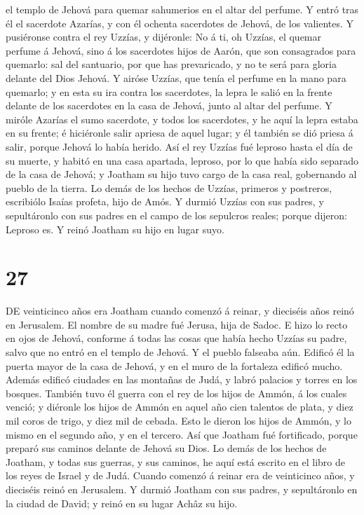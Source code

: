 el templo de Jehová para quemar sahumerios en el altar del perfume.
 Y entró tras él el sacerdote Azarías, y con él ochenta
sacerdotes de Jehová, de los valientes.  Y pusiéronse
contra el rey Uzzías, y dijéronle: No á ti, oh Uzzías, el quemar perfume
á Jehová, sino á los sacerdotes hijos de Aarón, que son consagrados para
quemarlo: sal del santuario, por que has prevaricado, y no te será para
gloria delante del Dios Jehová.  Y airóse Uzzías, que
tenía el perfume en la mano para quemarlo; y en esta su ira contra los
sacerdotes, la lepra le salió en la frente delante de los sacerdotes en
la casa de Jehová, junto al altar del perfume.  Y miróle
Azarías el sumo sacerdote, y todos los sacerdotes, y he aquí la lepra
estaba en su frente; é hiciéronle salir apriesa de aquel lugar; y él
también se dió priesa á salir, porque Jehová lo había herido.
 Así el rey Uzzías fué leproso hasta el día de su muerte,
y habitó en una casa apartada, leproso, por lo que había sido separado
de la casa de Jehová; y Joatham su hijo tuvo cargo de la casa real,
gobernando al pueblo de la tierra.  Lo demás de los
hechos de Uzzías, primeros y postreros, escribiólo Isaías profeta, hijo
de Amós.  Y durmió Uzzías con sus padres, y sepultáronlo
con sus padres en el campo de los sepulcros reales; porque dijeron:
Leproso es. Y reinó Joatham su hijo en lugar suyo.

\hypertarget{section-26}{%
\section{27}\label{section-26}}

 DE veinticinco años era Joatham cuando comenzó á reinar,
y dieciséis años reinó en Jerusalem. El nombre de su madre fué Jerusa,
hija de Sadoc.  E hizo lo recto en ojos de Jehová,
conforme á todas las cosas que había hecho Uzzías su padre, salvo que no
entró en el templo de Jehová. Y el pueblo falseaba aún. 
Edificó él la puerta mayor de la casa de Jehová, y en el muro de la
fortaleza edificó mucho.  Además edificó ciudades en las
montañas de Judá, y labró palacios y torres en los bosques.
 También tuvo él guerra con el rey de los hijos de Ammón,
á los cuales venció; y diéronle los hijos de Ammón en aquel año cien
talentos de plata, y diez mil coros de trigo, y diez mil de cebada. Esto
le dieron los hijos de Ammón, y lo mismo en el segundo año, y en el
tercero.  Así que Joatham fué fortificado, porque preparó
sus caminos delante de Jehová su Dios.  Lo demás de los
hechos de Joatham, y todas sus guerras, y sus caminos, he aquí está
escrito en el libro de los reyes de Israel y de Judá. 
Cuando comenzó á reinar era de veinticinco años, y dieciséis reinó en
Jerusalem.  Y durmió Joatham con sus padres, y
sepultáronlo en la ciudad de David; y reinó en su lugar Achâz su hijo.

